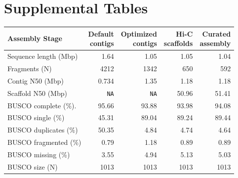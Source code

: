 \section*{Supplemental Tables}

\begin{table}[ht]
    \centering
    \begin{tabular}{lrrrr}
        \toprule
        Assembly Stage &
            \shortstack{Default \\ contigs} &
            \shortstack{Optimized \\ contigs} &
            \shortstack{Hi-C \\ scaffolds} &
            \shortstack{Curated \\ assembly} \\
        \midrule
        Sequence length (Mbp)          & 1.64        & 1.05        & 1.05       & 1.04 \\
        Fragments (N)                  & \num{4212}  & \num{1342}  & 650        & 592 \\
        Contig N50 (Mbp)               & 0.734       & 1.35        & 1.18       & 1.18 \\
        Scaffold N50 (Mbp)             & \texttt{NA} & \texttt{NA} & 50.96      & 51.41 \\
        \textsc{BUSCO} complete (\%).  & 95.66       & 93.88       & 93.98      & 94.08 \\
        \textsc{BUSCO} single (\%)     & 45.31       & 89.04       & 89.24      & 89.44 \\
        \textsc{BUSCO} duplicates (\%) & 50.35       & 4.84        & 4.74       & 4.64 \\
        \textsc{BUSCO} fragmented (\%) & 0.79        & 1.18        & 0.89       & 0.89 \\
        \textsc{BUSCO} missing (\%)    & 3.55        & 4.94        & 5.13       & 5.03 \\
        \textsc{BUSCO} size (N)        & \num{1013}  & \num{1013}  & \num{1013} & \num{1013} \\
        \bottomrule
    \end{tabular}
    \label{tab:sup_asm_stats}
\end{table}

